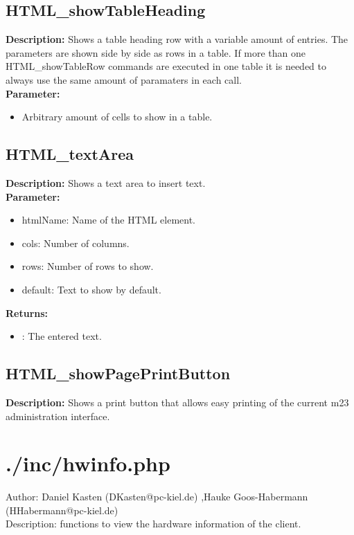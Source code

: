 \subsection{HTML\_showTableHeading}
\textbf{Description:} Shows a table heading row with a variable amount of entries. The parameters are shown side by side as rows in a table. If more than one HTML\_showTableRow commands are executed in one table it is needed to always use the same amount of paramaters in each call.\\
\textbf{Parameter:}
\begin{itemize}
\item Arbitrary amount of cells to show in a table.
\end{itemize}

\subsection{HTML\_textArea}
\textbf{Description:} Shows a text area to insert text.\\
\textbf{Parameter:}
\begin{itemize}
\item htmlName: Name of the HTML element.
\item cols: Number of columns.
\item rows: Number of rows to show.
\item default: Text to show by default.
\end{itemize}
\textbf{Returns:}
\begin{itemize}
\item : The entered text.
\end{itemize}

\subsection{HTML\_showPagePrintButton}
\textbf{Description:} Shows a print button that allows easy printing of the current m23 administration interface.\\

\newpage\section{./inc/hwinfo.php}
 Author: Daniel Kasten (DKasten@pc-kiel.de) ,Hauke Goos-Habermann (HHabermann@pc-kiel.de)\\
 Description: functions to view the hardware information of the client.\\

